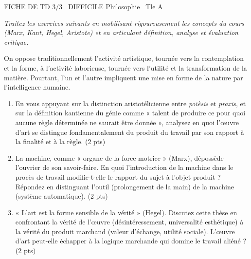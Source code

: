 \documentclass[11pt]{article}
\begin{document}
\begin{tcolorbox}[enhanced,colback=popink,colframe=popink,arc=10pt,boxrule=0pt,left=12pt,right=12pt,top=9pt,bottom=9pt]
{\color{white}\popxbold\small FICHE DE TD 3/3 \textbullet\ DIFFICILE \hfill Philosophie \textbullet\ Tle A\par}
\end{tcolorbox}
\vspace{4pt}
\noindent \textit{Traitez les exercices suivants en mobilisant rigoureusement les concepts du cours (Marx, Kant, Hegel, Aristote) et en articulant définition, analyse et évaluation critique.}

\begin{exercice}
On oppose traditionnellement l'activité artistique, tournée vers la contemplation et la forme, à l'activité laborieuse, tournée vers l'utilité et la transformation de la matière. Pourtant, l'un et l'autre impliquent une mise en forme de la nature par l'intelligence humaine.

\begin{enumerate}
    \item En vous appuyant sur la distinction aristotélicienne entre \textit{poïèsis} et \textit{praxis}, et sur la définition kantienne du génie comme « talent de produire ce pour quoi aucune règle déterminée ne saurait être donnée », analysez en quoi l'œuvre d'art se distingue fondamentalement du produit du travail par son rapport à la finalité et à la règle. (2 pts)
    \item La machine, comme « organe de la force motrice » (Marx), dépossède l'ouvrier de son savoir-faire. En quoi l'introduction de la machine dans le procès de travail modifie-t-elle le rapport du sujet à l'objet produit ? Répondez en distinguant l'outil (prolongement de la main) de la machine (système automatique). (2 pts)
    \item « L'art est la forme sensible de la vérité » (Hegel). Discutez cette thèse en confrontant la vérité de l'œuvre (désintéressement, universalité esthétique) à la vérité du produit marchand (valeur d'échange, utilité sociale). L'œuvre d'art peut-elle échapper à la logique marchande qui domine le travail aliéné ? (2 pts)
\end{enumerate}
\end{exercice}
\end{document}
